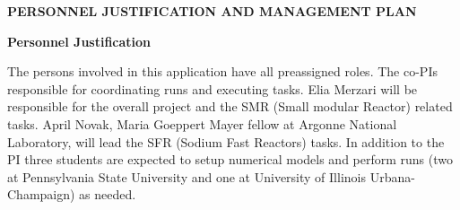 \documentclass[11pt,letterpaper,english]{article}
\begin{document}
\setlength{\parindent}{0in} %

\pagestyle{fancy}   \renewcommand{%
\headrulewidth}{0.0pt}

\begin{center}
\bf {PERSONNEL JUSTIFICATION AND MANAGEMENT PLAN} \\
\end{center}

\vspace{-.25in}
\justify
{\noindent \bf  {Personnel Justification}}

\noindent The persons involved in this application have all preassigned roles. The co-PIs responsible for coordinating runs and executing tasks. Elia Merzari will be responsible for the overall  project and the SMR (Small modular Reactor) related tasks. April Novak, Maria Goeppert Mayer fellow at Argonne National Laboratory, will lead the SFR (Sodium Fast Reactors) tasks. In addition to the PI three students are expected to setup numerical models and perform runs (two at Pennsylvania State University and one at University of Illinois Urbana-Champaign) as needed.
\end{document}
